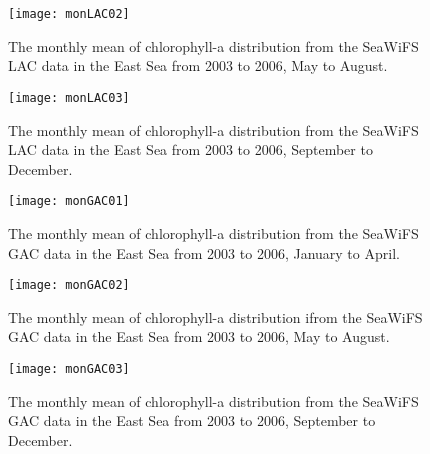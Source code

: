 \begin{figure}[h]
	\centering
	\texttt{[image: monLAC02]}\\
	\caption{The monthly mean of chlorophyll-a distribution from the SeaWiFS LAC data in the East Sea from 2003 to 2006, May to August.}
	\label{fig:monLAC02}
\end{figure}

\begin{figure}[h]
	\centering
	\texttt{[image: monLAC03]}\\
	\caption{The monthly mean of chlorophyll-a distribution from the SeaWiFS LAC data in the East Sea from 2003 to 2006, September to December.}
	\label{fig:monLAC03}
\end{figure}


\begin{figure}[h]
	\centering
	\texttt{[image: monGAC01]}\\
	\caption{The monthly mean of chlorophyll-a distribution from the SeaWiFS GAC data in the East Sea from 2003 to 2006, January to April.}
	\label{fig:monGAC01}
\end{figure}


\begin{figure}[h]
	\centering
	\texttt{[image: monGAC02]}\\
	\caption{The monthly mean of chlorophyll-a distribution ifrom the SeaWiFS GAC data in the East Sea from 2003 to 2006, May to August.}
	\label{fig:monGAC02}
\end{figure}


\begin{figure}[h]
	\centering
	\texttt{[image: monGAC03]}\\
	\caption{The monthly mean of chlorophyll-a distribution from the SeaWiFS GAC data in the East Sea from 2003 to 2006, September to December.}
	\label{fig:monGAC03}
\end{figure}
